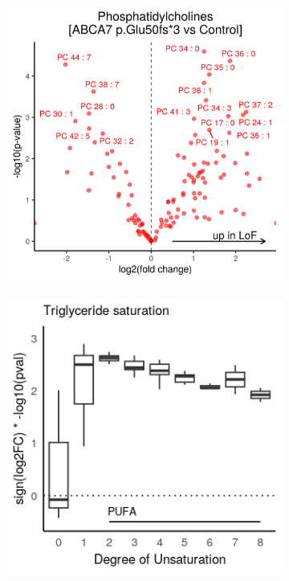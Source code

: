 \begin{figure}[ht]
\begin{subfigure}[t]{.24\textwidth}
        \includegraphics[width=\textwidth]{./main_plots/pc_volcano.png}        
    \end{subfigure} 
    \begin{subfigure}[t]{.24\textwidth}
        \caption{}
        \includegraphics[width=\textwidth]{./main_plots/TG_saturation.png}        

\end{subfigure}
\end{figure}
